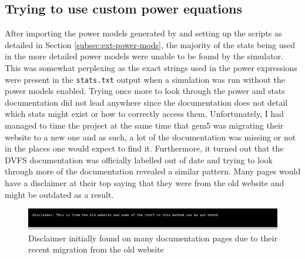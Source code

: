     \subsection{Trying to use custom power equations}
    After importing the power models generated by 
    \cite{walker_mattw200gemstone-applypower_2018} and setting up the scripts as
    detailed in Section \ref{subsec:ext-power-mods}, the majority of the stats 
    being used in the more detailed power models were unable to be found by the 
    simulator. This was somewhat perplexing as the exact strings used in the 
    power expressions were present in the \texttt{stats.txt} output when a 
    simulation was run without the power models enabled. Trying once more to 
    look through the power \cite{noauthor_gem5_nodate-1} and stats 
    \cite{noauthor_gem5_nodate-3} documentation did not lead anywhere since the 
    documentation does not detail which stats might exist or how to correctly 
    access them. Unfortunately, I had managed to time the project at the same 
    time that gem5 was migrating their website to a new one and as such, a lot 
    of the documentation was missing or not in the places one would expect to 
    find it. Furthermore, it turned out that the DVFS documentation was 
    officially labelled out of date \cite{noauthor_gem5_nodate} and trying to 
    look through more of the documentation revealed a similar pattern. Many 
    pages would have a disclaimer at their top saying that they were from the 
    old website and might be outdated as a result.
    \begin{figure}[H]
        \centering
        \includegraphics[width=0.9\linewidth]{screenshots/gem5-docs-disclaimer.png}
        \caption{Disclaimer initially found on many documentation pages due to 
                 their recent migration from the old website}
    \end{figure}

